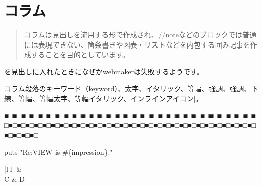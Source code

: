 \chapter{コラム}
\label{chap:ch03}

\begin{quotation}
コラムは見出しを流用する形で作成され、//noteなどのブロックでは普通には表現できない、箇条書きや図表・リストなどを内包する囲み記事を作成することを目的としています。
\end{quotation}

\begin{reviewcolumn}

\protect\footnotemark{}を見出しに入れたときになぜかwebmakerは失敗するようです。

コラム段落のキーワード（keyword）、太字、イタリック、等幅、強調、強調、下線、等幅、等幅太字、等幅イタリック、インラインアイコン]。\protect\footnotemark{}

\noindent
■□■□■□■□■□■□■□■□■□■□■□■□■□■□■□■□■□■□■□■□■□■□■□■□■□■□■□■□■□■□■□■□■□■□■□■□■□■□■□■□■□■□■□■□■□■□■□■□■□■□■□■□■□■□■□■□■□■□■□■□■□■□■□

\begin{reviewlistblock}
\begin{reviewlist}
puts "Re:VIEW is \#\{impression\}."
\end{reviewlist}
\end{reviewlistblock}

\begin{reviewimage}%
\label{image:ch03:img3-1}
\end{reviewimage}
\begin{reviewimage}%
\end{reviewimage}
\begin{table}%
\label{table:ch03:tab3-1}
\begin{reviewtable}{|l|l|}
\hline
{} &  \\  \hline
C & D \\  \hline
\end{reviewtable}
\end{table}


\end{reviewcolumn}
